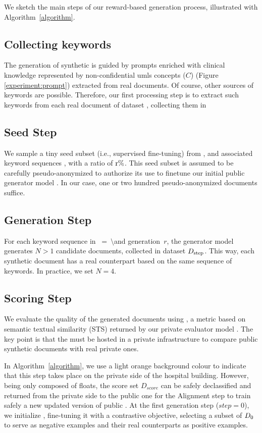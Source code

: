 We sketch the main steps of our reward-based generation process, illustrated with Algorithm~\ref{algorithm}.

\subsection{Collecting keywords}

The generation of synthetic  is guided by prompts enriched with clinical knowledge represented by non-confidential \gls{umls} concepts ($C$) (Figure \ref{experiment:prompt}) extracted from real documents. Of course, other sources of keywords are possible. Therefore, our first processing step is to extract such keywords from each real document of dataset \dgen, collecting them in \kgen

\subsection{Seed Step}

We sample a tiny seed subset \dsft (i.e., supervised fine-tuning) from \dgen, and associated keyword sequences \ksft, with a ratio of $\rsft\%$. This seed subset is assumed to be carefully pseudo-anonymized to authorize its use to finetune our initial public generator model \mg. In our case, one or two hundred pseudo-anonymized documents suffice.

\subsection{Generation Step}
For each keyword sequence in \ktr$~=~$\kgen$\setminus$\ksft and generation~$r$, the generator model \mg generates $N>1$ candidate documents, collected in dataset $D_{\mathrm{step}}$. This way, each synthetic document has a real counterpart based on the same sequence of keywords. In practice, we set $N=4$.

\subsection{Scoring Step}
\label{subsec:scoring-step}

We evaluate the quality of the generated documents using \score \cite{aynetdinov2024semscore}, a metric based on semantic textual similarity (STS) returned by our private evaluator model \me. The key point is that the \me must be hosted in a private infrastructure to compare public synthetic documents with real private ones.

In Algorithm~\ref{algorithm}, we use a light orange background colour to indicate that this step takes place on the private side of the hospital building. However, being only composed of floats, the score set $D_{score}$ can be safely declassified and returned from the private side to the public one for the Alignment step to train safely a new updated version of public \mg.
At the first generation step ($step = 0$), we initialize \me, fine-tuning it with a contrastive objective, selecting a subset of $D_{\mathrm{0}}$ to serve as negative examples and their real counterparts as positive examples. 

